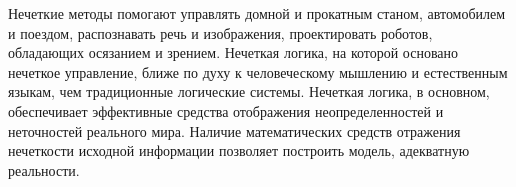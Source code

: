 \documentclass[a4paper,12pt]{report}
\begin{document}
Нечеткие методы помогают управлять домной и прокатным станом, автомобилем и поездом, распознавать речь и изображения, проектировать роботов, обладающих осязанием и зрением. Нечеткая логика, на которой основано нечеткое управление, ближе по духу к человеческому мышлению и естественным языкам, чем традиционные логические системы. Нечеткая логика, в основном, обеспечивает эффективные средства отображения неопределенностей и неточностей реального мира. Наличие математических средств отражения нечеткости исходной информации позволяет построить модель, адекватную реальности.



\end{document}
